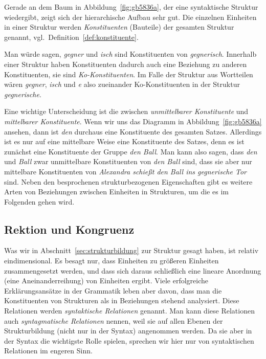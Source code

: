 Gerade an dem Baum in Abbildung~\ref{fig:gb5836a}, der eine syntaktische Struktur wiedergibt, zeigt sich der hierarchische Aufbau sehr gut.
Die einzelnen Einheiten in einer Struktur werden \textit{Konstituenten} (Bauteile) der gesamten Struktur genannt, vgl.\ Definition~\ref{def:konstituente}.

\Stretch[0.5]



Man würde sagen, \textit{gegner} und \textit{isch} sind Konstituenten von \textit{gegnerisch}.
Innerhalb einer Struktur haben Konstituenten dadurch auch eine Beziehung zu anderen Konstituenten, sie sind \textit{Ko-Konstituenten}.
Im Falle der Struktur aus Wortteilen wären \textit{gegner}, \textit{isch} und \textit{e} also zueinander Ko-Konstituenten in der Struktur \textit{gegnerische}.


Eine wichtige Unterscheidung ist die zwischen \textit{unmittelbarer Konstituente} und \textit{mittelbarer Konstituente}.
Wenn wir uns das Diagramm in Abbildung~\ref{fig:gb5836a} ansehen, dann ist \textit{den} durchaus eine Konstituente des gesamten Satzes.
Allerdings ist es nur auf eine mittelbare Weise eine Konstituente des Satzes, denn es ist zunächst eine Konstituente der Gruppe \textit{den Ball}.
Man kann also sagen, dass \textit{den} und \textit{Ball} zwar unmittelbare Konstituenten von \textit{den Ball} sind, dass sie aber nur mittelbare Konstituenten von \textit{Alexandra schießt den Ball ins gegnerische Tor} sind.
Neben den besprochenen strukturbezogenen Eigenschaften gibt es weitere Arten von Beziehungen zwischen Einheiten in Strukturen, um die es im Folgenden gehen wird.

\subsection{Rektion und Kongruenz}

\label{sec:rektionkongruenz}

Was wir in Abschnitt~\ref{sec:strukturbildung} zur Struktur gesagt haben, ist relativ eindimensional.
Es besagt nur, dass Einheiten zu größeren Einheiten zusammengesetzt werden, und dass sich daraus schließlich eine lineare Anordnung (eine Aneinanderreihung) von Einheiten ergibt.
Viele erfolgreiche Erklärungsansätze in der Grammatik leben aber davon, dass man die Konstituenten von Strukturen als in Beziehungen stehend analysiert.
Diese Relationen werden \textit{syntaktische Relationen} genannt.
Man kann diese Relationen auch \textit{syntagmatische Relationen} nennen, weil sie auf allen Ebenen der Strukturbildung (nicht nur in der Syntax) angenommen werden.
Da sie aber in der Syntax die wichtigste Rolle spielen, sprechen wir hier nur von syntaktischen Relationen im engeren Sinn.

